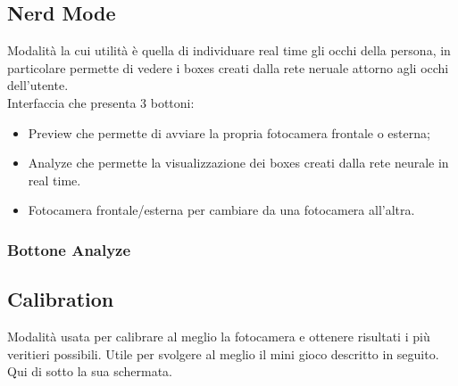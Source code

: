 \documentclass[11pt]{article}
\begin{document}
\subsection{Nerd Mode}
Modalità la cui utilità è quella di individuare real time gli occhi della persona, in particolare permette di vedere i boxes creati dalla rete neruale attorno agli occhi dell'utente.
\\Interfaccia che presenta 3 bottoni:
\begin{itemize}
    \item Preview che permette di avviare la propria fotocamera frontale o esterna;
    \item Analyze che permette la visualizzazione dei boxes creati dalla rete neurale in real time.
    \item Fotocamera frontale/esterna per cambiare da una fotocamera all'altra.
\end{itemize}
\subsubsection{Bottone Analyze}


\subsection{Calibration}
Modalità usata per calibrare al meglio la fotocamera e ottenere risultati i più veritieri possibili. Utile per svolgere al meglio il mini gioco descritto in seguito. Qui di sotto la sua schermata.
\end{document}
